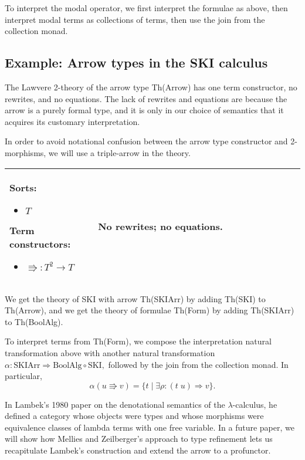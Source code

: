 \documentclass{llncs}
\newcommand{\maps}{\colon}
\renewcommand{\:}{\colon}
\begin{document}
To interpret the modal operator, we first interpret the formulae as above, then interpret modal terms as collections of terms, then use the join from the collection monad.

\subsection{Example: Arrow types in the SKI calculus}

The Lawvere 2-theory of the arrow type Th(Arrow) has one term constructor, no rewrites, and no equations.  The lack of rewrites and equations are because the arrow is a purely formal type, and it is only in our choice of semantics that it acquires its customary interpretation.

In order to avoid notational confusion between the arrow type constructor and 2-morphisms, we will use a triple-arrow in the theory.
\begin{center}
  \begin{longtable}{|p{0.3\linewidth}|p{0.7\linewidth}|}
    \hline
    Sorts:
    \begin{itemize}
      \item $T$
    \end{itemize}
    Term constructors:
    \begin{itemize}
      \item $\Rrightarrow \maps T^2 \to T$
    \end{itemize}
    &
    No rewrites; no equations.\\
    \hline
  \end{longtable}
\end{center}

We get the theory of SKI with arrow Th(SKIArr) by adding Th(SKI) to Th(Arrow), and we get the theory of formulae Th(Form) by adding Th(SKIArr) to Th(BoolAlg).

To interpret terms from Th(Form), we compose the interpretation natural transformation above with another natural transformation $\alpha\maps \mathrm{SKIArr} \Rightarrow \mathrm{BoolAlg} \circ \mathrm{SKI},$ followed by the join from the collection monad.  In particular, 
\[ \alpha(u \Rrightarrow v) = \{ t \;|\; \exists \rho\maps (t\; u) \Rightarrow v \}. \]

In Lambek's 1980 paper \cite{Lambek} on the denotational semantics of the $\lambda$-calculus, he defined a category whose objects were types and whose morphisms were equivalence classes of lambda terms with one free variable.  In a future paper, we will show how Mellies and Zeilberger's approach to type refinement lets us recapitulate Lambek's construction and extend the arrow to a profunctor.
\end{document}
